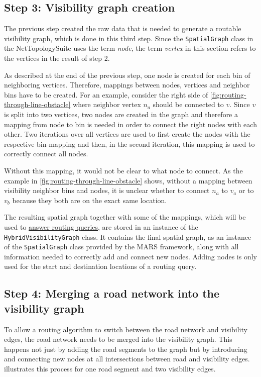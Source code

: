 	\subsection{Step 3: Visibility graph creation}
	\label{subsec:step-3-graph-creation}
	
		The previous step created the raw data that is needed to generate a routable visibility graph, which is done in this third step.
		Since the \texttt{SpatialGraph} class in the NetTopologySuite uses the term \emph{node}, the term \emph{vertex} in this section refers to the vertices in the result of step 2.
		
		As described at the end of the previous step, one node is created for each bin of neighboring vertices.
		Therefore, mappings between nodes, vertices and neighbor bins have to be created.
		For an example, consider the right side of \cref{fig:routing-through-line-obstacle} where neighbor vertex $n_a$ should be connected to $v$.
		Since $v$ is split into two vertices, two nodes are created in the graph and therefore a mapping from node to bin is needed in order to connect the right nodes with each other.
		Two iterations over all vertices are used to first create the nodes with the respective bin-mapping and then, in the second iteration, this mapping is used to correctly connect all nodes.
		
		Without this mapping, it would not be clear to what node to connect.
		As the example in \cref{fig:routing-through-line-obstacle} shows, without a mapping between visibility neighbor bins and nodes, it is unclear whether to connect $n_a$ to $v_a$ or to $v_b$ because they both are on the exact same location.
		
		The resulting spatial graph together with some of the mappings, which will be used to \hyperref[sec:answering-queries]{answer routing queries}, are stored in an instance of the \texttt{HybridVisibilityGraph} class.
		It contains the final spatial graph, as an instance of the \texttt{SpatialGraph} class provided by the MARS framework, along with all information needed to correctly add and connect new nodes.
		Adding nodes is only used for the start and destination locations of a routing query.
		
	\subsection{Step 4: Merging a road network into the visibility graph}
	\label{subsec:step-4-graph merging}
	
		To allow a routing algorithm to switch between the road network and visibility edges, the road network needs to be merged into the visibility graph.
		This happens not just by adding the road segments to the graph but by introducing and connecting new nodes at all intersections between road and visibility edges.
		 illustrates this process for one road segment and two visibility edges.
		
